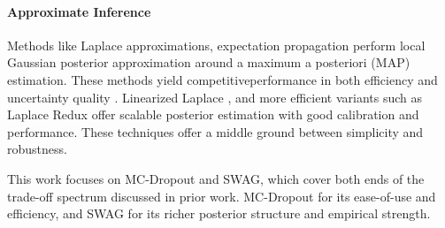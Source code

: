 \paragraph{Approximate Inference}
Methods like Laplace approximations, expectation propagation perform local Gaussian posterior approximation
around a maximum a posteriori (MAP) estimation. These methods yield competitiveperformance in both
efficiency and uncertainty quality \citep[see, e.g.,][]{ritter2018kfaclaplace}. Linearized Laplace
\citep{antoran2022linearizedlaplace}, and more efficient variants such as Laplace Redux
\citep{daxberger2022laplaceredux} offer scalable posterior estimation with good calibration and
performance. These techniques offer a middle ground between simplicity and robustness.

\vspace{0.4cm}
This work focuses on MC-Dropout and SWAG, which cover both ends of the trade-off spectrum discussed in
prior work. MC-Dropout for its ease-of-use and efficiency, and SWAG for its richer posterior structure
and empirical strength.

